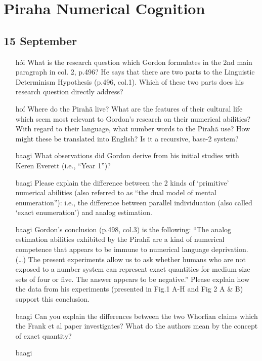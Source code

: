 \documentclass[]{article}
\date{}
\begin{document}
\section{Piraha Numerical Cognition}\label{piraha-numerical-cognition}

\subsection{15 September}\label{september}

\begin{itemize}
\item [h\'{o}i]
  What is the research question which Gordon formulates in the 2nd main
  paragraph in col. 2, p.496? He says that there are two parts to the
  Linguistic Determinism Hypothesis (p.496, col.1). Which of these two
  parts does his research question directly address?
\item [ho\'{i}]
  Where do the Pirahã live? What are the features of their cultural life
  which seem most relevant to Gordon's research on their numerical
  abilities? With regard to their language, what number words to the
  Pirahã use? How might these be translated into English? Is it a
  recursive, base-2 system?
\item [baagi]
  What observations did Gordon derive from his initial studies with
  Keren Everett (i.e., ``Year 1'')?
\item [baagi]
  Please explain the difference between the 2 kinds of `primitive'
  numerical abilities (also referred to as ``the dual model of mental
  enumeration''): i.e., the difference between parallel individuation
  (also called `exact enumeration') and analog estimation.
\item [baagi]
  Gordon's conclusion (p.498, col.3) is the following: ``The analog
  estimation abilities exhibited by the Pirahã are a kind of numerical
  competence that appears to be immune to numerical language
  deprivation. (\ldots{}) The present experiments allow us to ask
  whether humans who are not exposed to a number system can represent
  exact quantities for medium-size sets of four or five. The answer
  appears to be negative.'' Please explain how the data from his
  experiments (presented in Fig.1 A-H and Fig 2 A \& B) support this
  conclusion.
\item [baagi]
  Can you explain the differences between the two Whorfian claims which
  the Frank et al paper investigates? What do the authors mean by the
  concept of exact quantity?
\item [baagi]

\end{itemize}
\end{document}
